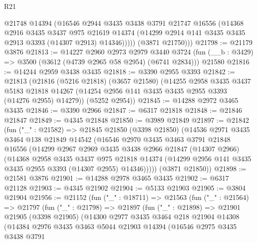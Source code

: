 \begin{lexlean}{R21}
\begin{coremodule}
            @21748
            @14394
            (@16546
              @2944
              @3435
              @3438
              @3791
              @21747
              @16556
              (@14368
                @2916
                @3435
                @3437
                @975
                @21619
                @14374
                (@14299 @2914 @141 @3435 @3435 @2913 @3393 (@14307 @2913) @14346)))))
        (@3871 @21750)))
@21798 := @21179 @3876
@21813 := @14227
    @2960
    @2973
    @2979
    @3440
    @3724
    (fun (__b : @3429) => @3500 (@3612 (@4739 @2965 @58 @2954) (@6741 @2834)))
    @21580
@21816 := @14244 @2959 @3438 @3435
@21818 := @3390 @2955 @3393
@21842 := @21813
    (@21816
      (@5216 @21818)
      (@3657 @21580)
      (@14255
        @2958
        @3435
        @3437
        @5183
        @21818
        @14267
        (@14254 @2956 @141 @3435 @3435 @2955 @3393 (@14276 @2955) @14279))
      (@5252 @2954))
@21845 := @14288 @2972 @3465 @3435
@21846 := @3390 @2966
@21847 := @6317 @21818
@21848 := @21846 @21847
@21849 := @4345 @21848
@21850 := @3989 @21849
@21897 := @21842
    (fun ("_" : @21582) =>
    @21845
      @21850
      (@3398 @21850)
      (@14536
        @2971
        @3435
        @3464
        @138
        @21849
        @14542
        (@16546
          @2970
          @3435
          @3463
          @3791
          @21848
          @16556
          (@14299
            @2967
            @2969
            @3435
            @3438
            @2966
            @21847
            (@14307 @2966)
            (@14368
              @2958
              @3435
              @3437
              @975
              @21818
              @14374
              (@14299 @2956 @141 @3435 @3435 @2955 @3393 (@14307 @2955) @14346)))))
      (@3871 @21850))
@21898 := @21581 @3876
@21901 := @14288 @2978 @3465 @3435
@21902 := @6317 @21128
@21903 := @4345 @21902
@21904 := @5133 @21903
@21905 := @3804 @21904
@21956 := @21152
    (fun ("_" : @18711) =>
    @21563
      (fun ("_" : @21564) =>
      @21797
        (fun ("_" : @21798) =>
        @21897
          (fun ("_" : @21898) =>
          @21901
            @21905
            (@3398 @21905)
            (@14300
              @2977
              @3435
              @3464
              @218
              @21904
              @14308
              (@14384
                @2976
                @3435
                @3463
                @5044
                @21903
                @14394
                (@16546
                  @2975
                  @3435
                  @3438
                  @3791

\end{coremodule}
\end{lexlean}
